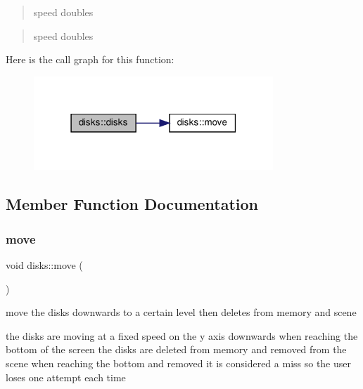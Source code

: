 \begin{quote}
speed doubles \end{quote}


\begin{quote}
speed doubles \end{quote}
Here is the call graph for this function\+:
\nopagebreak
\begin{figure}[H]
\begin{center}
\leavevmode
\includegraphics[width=255pt]{classdisks_ad7db6d6d8d1229f480da7c095ec29130_cgraph}
\end{center}
\end{figure}


\subsection{Member Function Documentation}
\mbox{\label{classdisks_ad9b431cedd6b82de1327bd241f23ab06}} 
\subsubsection{\texorpdfstring{move}{move}}
{\footnotesize\ttfamily void disks\+::move (\begin{DoxyParamCaption}{ }\end{DoxyParamCaption})\hspace{0.3cm}{\ttfamily [slot]}}



move the disks downwards to a certain level then deletes from memory and scene 

the disks are moving at a fixed speed on the y axis downwards when reaching the bottom of the screen the disks are deleted from memory and removed from the scene when reaching the bottom and removed it is considered a miss so the user loses one attempt each time


